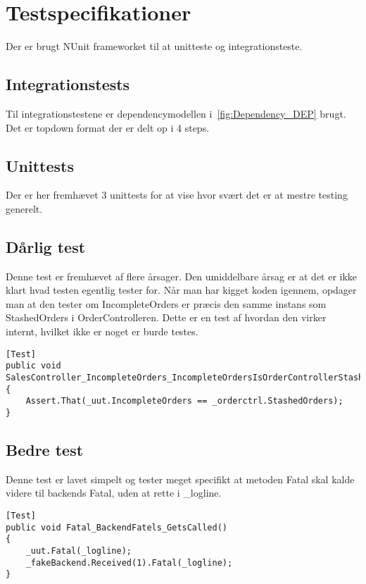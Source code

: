 \section{Testspecifikationer}

Der er brugt NUnit frameworket til at unitteste og integrationsteste. 

\subsection{Integrationstests}
Til integrationstestene er dependencymodellen i~\ref{fig:Dependency_DEP} brugt. Det er topdown format der er delt op i 4 steps. 

\subsection{Unittests}

Der er her fremhævet 3 unittests for at vise hvor svært det er at mestre testing generelt.

\subsection{Dårlig test}
Denne test er fremhævet af flere årsager. Den umiddelbare årsag er at det er ikke klart hvad testen egentlig tester for. Når man har kigget koden igennem, opdager man at den tester om IncompleteOrders er præcis den samme instans som StashedOrders i OrderControlleren. Dette er en test af hvordan den virker internt, hvilket ikke er noget er burde testes.
\begin{lstlisting}
[Test]
public void SalesController_IncompleteOrders_IncompleteOrdersIsOrderControllerStashedOrders()
{
    Assert.That(_uut.IncompleteOrders == _orderctrl.StashedOrders);
}
\end{lstlisting}	


\subsection{Bedre test}
Denne test er lavet simpelt og tester meget specifikt at metoden Fatal skal kalde videre til backends Fatal, uden at rette i \_logline.

\begin{lstlisting}
[Test]
public void Fatal_BackendFatels_GetsCalled()
{
    _uut.Fatal(_logline);
    _fakeBackend.Received(1).Fatal(_logline);
}
\end{lstlisting}


